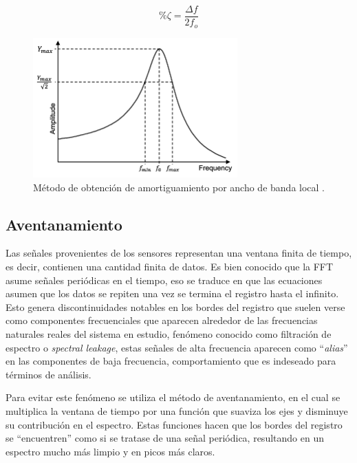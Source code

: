 \begin{itemize}
    \begin{equation}
        \%\zeta = \frac{\Delta f}{2f_o}
    \end{equation}
    
    \begin{figure}[H]
        \centering
        \includegraphics[width = 0.7\textwidth]{imagenes/cap1_marcoteo/Half-power-bandwidth-method.png}
        \caption{Método de obtención de amortiguamiento por ancho de banda local \citep{potenciamitad2019}.}
        \label{fig:potenciamitad}
    \end{figure}
\end{itemize}


\subsection{Aventanamiento}
\label{sec:aventanamiento}
Las señales provenientes de los sensores representan una ventana finita de tiempo, es decir, contienen una cantidad finita de datos. Es bien conocido que la FFT asume señales periódicas en el tiempo, eso se traduce en que las ecuaciones asumen que los datos se repiten una vez se termina el registro hasta el infinito. Esto genera discontinuidades notables en los bordes del registro que suelen verse como componentes frecuenciales que aparecen alrededor de las frecuencias naturales reales del sistema en estudio, fenómeno conocido como filtración de espectro o \textit{spectral leakage}, estas señales de alta frecuencia aparecen como ``\textit{alias}'' en las componentes de baja frecuencia, comportamiento que es indeseado para términos de análisis.

Para evitar este fenómeno se utiliza el método de aventanamiento, en el cual se multiplica la ventana de tiempo por una función que suaviza los ejes y disminuye su contribución en el espectro. Estas funciones hacen que los bordes del registro se ``encuentren'' como si se tratase de una señal periódica, resultando en un espectro mucho más limpio y en picos más claros.

